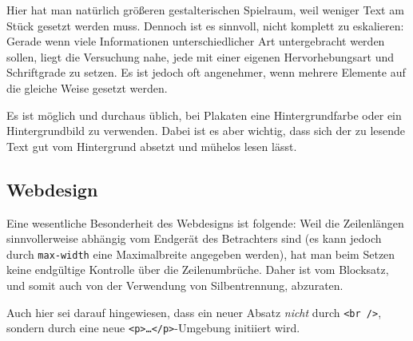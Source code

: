 Hier hat man natürlich größeren gestalterischen Spielraum, weil weniger Text am
Stück gesetzt werden muss. Dennoch ist es sinnvoll, nicht komplett zu
eskalieren: Gerade wenn viele Informationen unterschiedlicher Art untergebracht
werden sollen, liegt die Versuchung nahe, jede mit einer eigenen
Hervorhebungsart und Schriftgrade zu setzen. Es ist jedoch oft angenehmer, wenn
mehrere Elemente auf die gleiche Weise gesetzt werden.

Es ist möglich und durchaus üblich, bei Plakaten eine Hintergrundfarbe oder ein
Hintergrundbild zu verwenden. Dabei ist es aber wichtig, dass sich der zu
lesende Text gut vom Hintergrund absetzt und mühelos lesen lässt. 

\subsection{Webdesign}

Eine wesentliche Besonderheit des Webdesigns ist folgende: Weil die Zeilenlängen
sinnvollerweise abhängig vom Endgerät des Betrachters sind (es kann jedoch durch
\verb!max-width! eine Maximalbreite angegeben werden), hat man beim Setzen keine
endgültige Kontrolle über die Zeilenumbrüche. Daher ist vom Blocksatz, und somit
auch von der Verwendung von Silbentrennung, abzuraten.

Auch hier sei darauf hingewiesen, dass ein neuer Absatz \emph{nicht} durch
\verb!<br />!, sondern durch eine neue \verb!<p>…</p>!-Umgebung initiiert wird.

